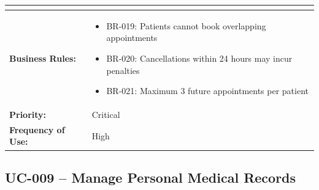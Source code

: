 \documentclass[12pt,a4paper]{article}
\begin{document}
\begin{longtable}{|p{4.5cm}|p{10.5cm}|}
\begin{itemize}
\end{itemize} \\
\hline
\textbf{Business Rules:} &
\begin{itemize}
  \item BR-019: Patients cannot book overlapping appointments
  \item BR-020: Cancellations within 24 hours may incur penalties
  \item BR-021: Maximum 3 future appointments per patient
\end{itemize} \\
\hline
\textbf{Priority:} & Critical \\
\hline
\textbf{Frequency of Use:} & High \\
\hline
\end{longtable}

\subsection{UC-009 – Manage Personal Medical Records}
\end{document}

